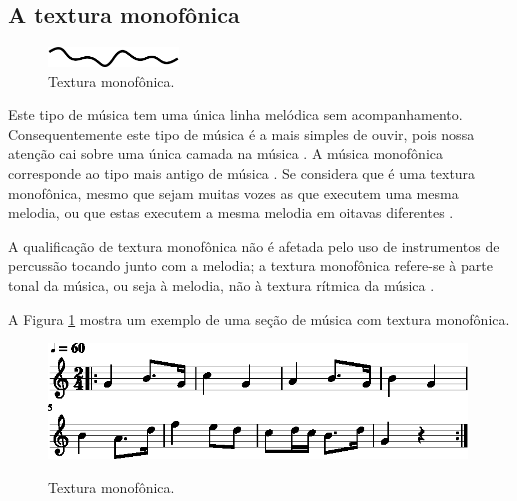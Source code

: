 \subsection{A textura monofônica}
\label{subsec:monofonica}
\begin{figure}
\centering
    \vspace{-10pt}
    \includegraphics[width=0.31\textwidth]{chapters/cap-musicalidade-percepcion/monofonica1.eps}
  \caption{Textura monofônica.}
\end{figure}
Este tipo de música tem uma única linha melódica sem acompanhamento.
Consequentemente este tipo de música é a mais simples de ouvir, 
pois nossa atenção cai sobre uma única camada na música \cite[pp. 77]{copland1974ouvir} \cite[pp. 29]{kerman2015listen}.
A música monofônica corresponde ao tipo mais antigo de música \cite[pp. 539]{apel1969harvard}.
Se considera que é uma textura monofônica, mesmo que sejam muitas vozes as que executem uma mesma melodia, 
ou que estas executem a mesma melodia em oitavas diferentes \cite[pp. 42]{bennett1993elementos} \cite[pp. 58]{holland2013music}.

A qualificação de textura  monofônica não é afetada pelo uso de instrumentos de percussão tocando junto com a melodia;
a textura monofônica refere-se à parte tonal da música, ou seja à melodia, 
não à textura rítmica da música \cite[pp. 58]{holland2013music}.

\begin{example}
A Figura \ref{fig:ex:monofonica} mostra um exemplo de uma seção de música com textura monofônica.
\end{example}

\begin{figure}[!h]
\centering
    \href{https://drive.google.com/file/d/1o2xCKp2U40Yl28d-GyAbq_llg13Uv5sz/view?usp=sharing}{\includegraphics[width=0.99\textwidth]{chapters/cap-musicalidade-percepcion/textura-monofonica-1.eps}}
  \caption{Textura monofônica.}
\label{fig:ex:monofonica}
\end{figure}
 
